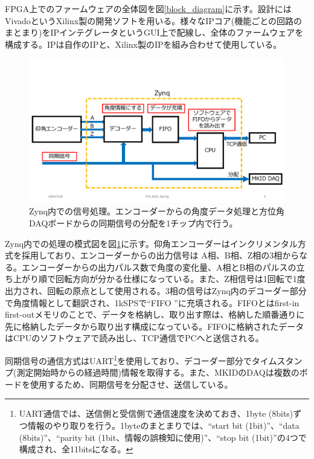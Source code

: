 FPGA上でのファームウェアの全体図を図\ref{block_diagram}に示す。設計にはVivadoというXilinx製の開発ソフトを用いる。様々なIPコア(機能ごとの回路のまとまり)をIPインテグレータというGUI上で配線し、全体のファームウェアを構成する。IPは自作のIPと、Xilinx製のIPを組み合わせて使用している。

\begin{figure}[htbp]
  \centering
  \includegraphics[width=1.0\columnwidth]{4_elDAQ/figs/zynq_flow.pdf}
  \caption{Zynq内での信号処理。エンコーダーからの角度データ処理と方位角DAQボードからの同期信号の分配を1チップ内で行う。}
  \label{zynq_flow}
\end{figure}

Zynq内での処理の模式図を図\ref{zynq_flow}に示す。仰角エンコーダーはインクリメンタル方式を採用しており、エンコーダーからの出力信号は A相、B相、Z相の3相からなる。エンコーダーからの出力パルス数で角度の変化量、A相とB相のパルスの立ち上がり順で回転方向が分かる仕様になっている。また、Z相信号は1回転で1度出力され、回転の原点として使用される。3相の信号はZynq内のデコーダー部分で角度情報として翻訳され、1kSPSで``FIFO \cite{FIFO}''に充填される。FIFOとはfirst-in first-outメモリのことで、データを格納し、取り出す際は、格納した順番通りに先に格納したデータから取り出す構成になっている。FIFOに格納されたデータはCPUのソフトウェアで読み出し、TCP通信でPCへと送信される。

同期信号の通信方式はUART\footnote{UART通信では、送信側と受信側で通信速度を決めておき、1byte (8bits)ずつ情報のやり取りを行う。1byteのまとまりでは、``start bit (1bit)''、``data (8bits)''、``parity bit (1bit、情報の誤検知に使用)''、``stop bit (1bit)''の4つで構成され、全11bitsになる。}を使用しており、デコーダー部分でタイムスタンプ(測定開始時からの経過時間)情報を取得する。また、MKIDのDAQは複数のボードを使用するため、同期信号を分配させ、送信している。

